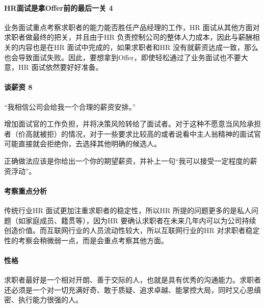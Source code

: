 \documentclass[letterpaper,11pt,english]{sphinxmanual}
\begin{document}
\paragraph{HR面试是拿Offer前的最后一关 4\sphinxfootnotemark[289]}
\label{\detokenize{chapter_interview/HR:hroffer-4}}%
\begin{footnotetext}[289]\sphinxAtStartFootnote
{}
%
\end{footnotetext}\ignorespaces 
业务面试重点考察求职者的能力能否胜任产品经理的工作，HR
面试从其他方面对求职者做最终的把关，并且由于HR
负责控制公司的整体人力成本，因此与薪酬相关的内容也是在HR
面试中完成的，如果求职者和HR
没有就薪资达成一致，那么也会导致面试失败。因此，要想拿到Offer，即使轻松通过了业务面试也不要大意，HR
面试依然要好好准备。


\paragraph{谈薪资 8\sphinxfootnotemark[290]}
\label{\detokenize{chapter_interview/HR:id2}}%
\begin{footnotetext}[290]\sphinxAtStartFootnote
{}
%
\end{footnotetext}\ignorespaces 
“我相信公司会给我一个合理的薪资安排。”

增加面试官的工作负担，并将决策风险转给了面试者。对于这种不愿意当风险承担者（价高就被拒）的情况，对于一些要求比较高的或者说看中主人翁精神的面试官可能直接就会拒绝你，去选择其他明确的候选人。

正确做法应该是你给出一个你的期望薪资，并补上一句“我可以接受一定程度的薪资浮动”。


\paragraph{考察重点分析}
\label{\detokenize{chapter_interview/HR:id3}}
传统行业HR 面试更加注重求职者的稳定性，所以HR
所提的问题更多的是私人问题（如家庭成员、籍贯等），因为HR
要确认求职者在未来几年内可以为公司持续创造价值。而互联网行业的人员流动性较大，所以互联网行业的HR
对求职者稳定性的考察会稍微弱一点，而是会重点考察其他方面。


\paragraph{性格}
\label{\detokenize{chapter_interview/HR:id4}}
求职者最好是一个相对开朗、善于交际的人，也就是具有优秀的沟通能力。求职者还必须是一个对一切充满好奇、敢于质疑、追求卓越、能掌控大局，同时又心思缜密、执行能力很强的人。
\end{document}
